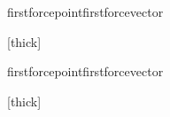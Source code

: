 {{		\pgfmathsetmacro\firstmomentx{\momentx}
		\pgfmathsetmacro\firstmomenty{\momenty}
		\pgfmathsetmacro\firstmomentz{\momentz}

		\pgfmathsetmacro{}
		\pgfmathsetmacro{}
		\pgfmathsetmacro{}

		\pgfmathsetmacro\momentx{\firstmomentx + \secondmomentx}
		\pgfmathsetmacro\momenty{\firstmomenty + \secondmomenty}
		\pgfmathsetmacro\momentz{\firstmomentz + \secondmomentz}

			{\epurecolor}{\epurecolor}{\epurecolor}
	}

	\calculateinternalmomentatpointfromforcename{\xsecond}{0}{0}%
		{firstforcepoint}{firstforcevector}

	\drawepurelinesatpointalongz{\xsecond}{0}{0}%
		{\epurecolor}{\epurecolor}{\epurecolor}%
		[thick]

	\saveepureendpoints

	\calculateinternalmomentatpointfromforcename{\xsecond}{0}{\zsecond}%
		{firstforcepoint}{firstforcevector}

	\drawepurelinesatpointalongz{\xsecond}{0}{\zsecond}%
		{\epurecolor}{\epurecolor}{\epurecolor}%
		[thick]

	\drawlinebetweensavedandcurrentx
}

\newcommand\drawepureofinternalmomentfromthirdforce{
	\def\epurecolor{\externalforcecolor}


	\pgfmathsetmacro\xmax{\xsecond}
	\foreach \xhatch in { 0, \hatchstep, ..., \xmax } {
		\calculateinternalmomentatpointfromforcename{\xhatch}{0}{0}%
			{thirdforcepoint}{thirdforcevector}

		\drawepurelinesatpointalongx{\xhatch}{0}{0}%
			{\epurecolor}{\epurecolor}{\epurecolor}
	}

	\calculateinternalmomentatpointfromforcename{0}{0}{0}%
		{thirdforcepoint}{thirdforcevector}
	\drawepurelinesatpointalongx{0}{0}{0}%
		{\epurecolor}{\epurecolor}{\epurecolor}%
		[thick]

	\saveepureendpoints

	\calculateinternalmomentatpointfromforcename{\xfirst}{0}{0}%
		{thirdforcepoint}{thirdforcevector}
	\drawepurelinesatpointalongx{\xfirst}{0}{0}%
		{\epurecolor}{\epurecolor}{\epurecolor}%
		[thick]

	\drawlinebetweensavedandcurrenty

	\saveepureendpoints

		{thirdforcepoint}{thirdforcevector}
	\drawepurelinesatpointalongx{\xsecond}{0}{0}%
		{\epurecolor}{\epurecolor}{\epurecolor}%
		[thick]

	\drawlinebetweensavedandcurrenty
}

\newcommand\drawepureofinternalmomentfromthirdandsecondforces[3]{
	\def\externalforcecolor{#1}
	\drawepureofinternalmomentfromthirdforce

	\def\externalforcecolor{#2}
	\drawepureofinternalmomentfromsecondforce
}
